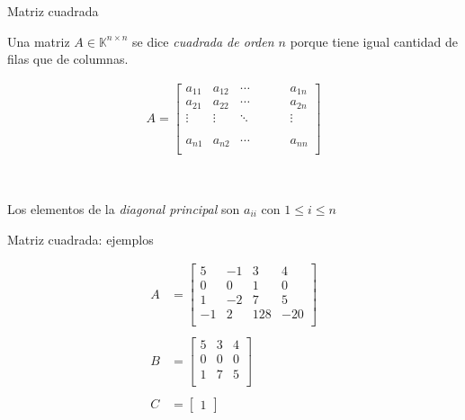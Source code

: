 \documentclass[handout]{beamer} %
\newcommand{\K}{\mathbb K}
\renewcommand{\_}[1]{_{\left[ #1 \right]}}
\renewcommand{\^}[1]{^{\left[ #1 \right]}}
\begin{document}
\begin{frame}{Matriz cuadrada}
	

		Una matriz {$A\in\K^{n\times n}$} se dice \textit{cuadrada de orden $n$} porque tiene igual cantidad de filas que de columnas.\pause

	\begin{align*}
		A=
		\left[
		\begin{array}{ccccccc}
			a_{11} & a_{12} & \cdots & & &  & a_{1n}\\ 
			a_{21} & a_{22} & \cdots & & &  & a_{2n}\\
			\vdots & \vdots & \ddots & & &  & \vdots\\
			& &  & & &  \\
			& &  & & &  \\
			a_{n1} & a_{n2} & \cdots & & & & a_{nn}\\ 
		\end{array}
		\right]
	\end{align*}
	
	\
	
	Los elementos de la \textit{diagonal principal} son $a_{ii}$ con $1\leq i\leq n$
\end{frame}


\begin{frame}{Matriz cuadrada: ejemplos}
	


\begin{align*}
	A&=
	\begin{bmatrix}
		5 & -1 & 3 & 4\\ 
		0 & 0 & 1 & 0\\
		1&-2 & 7 & 5 \\
		-1&2 & 128 & -20 \\
	\end{bmatrix}
	\\
&
	\\
	B&=
	\begin{bmatrix}
		5 &  3 & 4\\ 
		0 & 0  & 0\\
		1& 7 & 5 \\
	\end{bmatrix}
	\\
&
	\\
	C&=
	\begin{bmatrix}
		1
	\end{bmatrix}
\end{align*}
\vskip 1cm

\end{frame}
\end{document}
